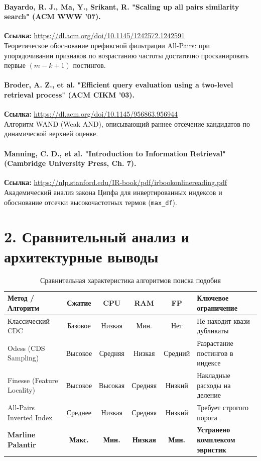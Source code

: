 \documentclass[a4paper,14pt]{extarticle}
\begin{document}
\paragraph{Bayardo, R. J., Ma, Y., Srikant, R. "Scaling up all pairs similarity search" (ACM WWW '07).}
\textbf{Ссылка:} \url{https://dl.acm.org/doi/10.1145/1242572.1242591} \\
Теоретическое обоснование префиксной фильтрации All-Pairs: при упорядочивании признаков по возрастанию частоты достаточно просканировать первые $(m - k + 1)$ постингов.

\paragraph{Broder, A. Z., et al. "Efficient query evaluation using a two-level retrieval process" (ACM CIKM '03).}
\textbf{Ссылка:} \url{https://dl.acm.org/doi/10.1145/956863.956944} \\
Алгоритм WAND (Weak AND), описывающий раннее отсечение кандидатов по динамической верхней оценке.

\paragraph{Manning, C. D., et al. "Introduction to Information Retrieval" (Cambridge University Press, Ch. 7).}
\textbf{Ссылка:} \url{https://nlp.stanford.edu/IR-book/pdf/irbookonlinereading.pdf} \\
Академический анализ закона Ципфа для инвертированных индексов и обоснование отсечки высокочастотных термов (\texttt{max\_df}).

\newpage

\section*{2. Сравнительный анализ и архитектурные выводы}

\begin{table}[h!]
\small
\centering
\caption{Сравнительная характеристика алгоритмов поиска подобия}
\label{tab:comp_main}
\begin{tabularx}{\textwidth}{p{3.8cm}ccccX}
\toprule
\textbf{Метод / Алгоритм} & \textbf{Сжатие} & \textbf{CPU} & \textbf{RAM} & \textbf{FP} & \textbf{Ключевое ограничение} \\
\midrule
Классический CDC & Базовое & Низкая & Мин. & Нет & Не находит квази-дубликаты \\
Odess (CDS Sampling) & Высокое & Средняя & Низкая & Средний & Разрастание постингов в индексе \\
Finesse (Feature Locality) & Высокое & Высокая & Средняя & Низкий & Накладные расходы на деление \\
All-Pairs Inverted Index & Среднее & Низкая & Средняя & Низкий & Требует строгого порога \\
\textbf{Marline Palantir} & \textbf{Макс.} & \textbf{Мин.} & \textbf{Низкая} & \textbf{Мин.} & \textbf{Устранено комплексом эвристик} \\
\bottomrule
\end{tabularx}
\end{table}
\end{document}
